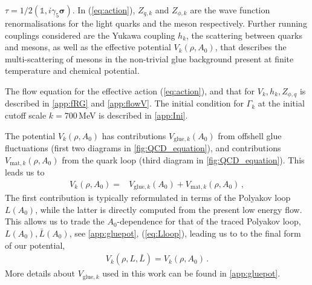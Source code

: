 \documentclass[%
reprint,
superscriptaddress,
showpacs,preprintnumbers,
amsmath,amssymb,
aps,
prd,
]{revtex4-1}
\newcommand{\Tr}{\ensuremath{\operatorname{Tr}}}
\def\Eq#1{Eq.~(\ref{#1})}
\def\eq#1{(\ref{#1})}
\begin{document}
	$\tau=1/2 (\mathbb{1}, i \gamma_5 \bm \sigma)$. In \eq{eq:action}, 
	$Z_{q,k}$ and $Z_{\phi,k}$ are the wave function renormalisations for the light quarks and the meson respectively. Further running couplings considered are the Yukawa coupling $h_k$, the scattering between quarks and mesons, as well as the effective potential $V_k(\rho,A_0)$, that describes the multi-scattering of mesons in the non-trivial glue background present at finite temperature and chemical potential.
	
	The flow equation for the effective action \eq{eq:action}, and that for $V_k, h_k, Z_{\phi,q}$ is described in \autoref{app:fRG} and \autoref{app:flowV}. The initial condition for $\Gamma_k$ at the initial cutoff scale $k=700$\,MeV is described in \autoref{app:Ini}. 
	
	The potential $V_k(\rho, A_0)$ has contributions $V_{\mathrm{glue},k}(A_0)$ from offshell glue fluctuations (first two diagrams in \autoref{fig:QCD_equation}), and contributions $V_{\mathrm{mat},k}(\rho,A_0)$ from the quark loop (third diagram in \autoref{fig:QCD_equation}). This leads us to 
	\begin{align}
		V_k(\rho,A_0)=&V_{\mathrm{glue},k}(A_0)+V_{\mathrm{mat},k}(\rho,A_0)\,,\label{eq:Vtotal}
	\end{align}
	The first contribution is typically reformulated in terms of the Polyakov loop $L(A_0)$, while the latter is directly computed from the present low energy flow. This allows us to trade the $A_0$-dependence for that of the traced Polyakov loop, $L(A_0), \bar L(A_0)$, see \autoref{app:gluepot}, \eq{eq:Lloop}, leading us to to the final form of our potential, 
	\begin{align}
		V_k(\rho, L,\bar L)= V_k(\rho, A_0)\,. 
	\end{align}
	More details about $V_{\mathrm{glue},k}$ used in this work can be found in \autoref{app:gluepot}. 
	
\end{document}
